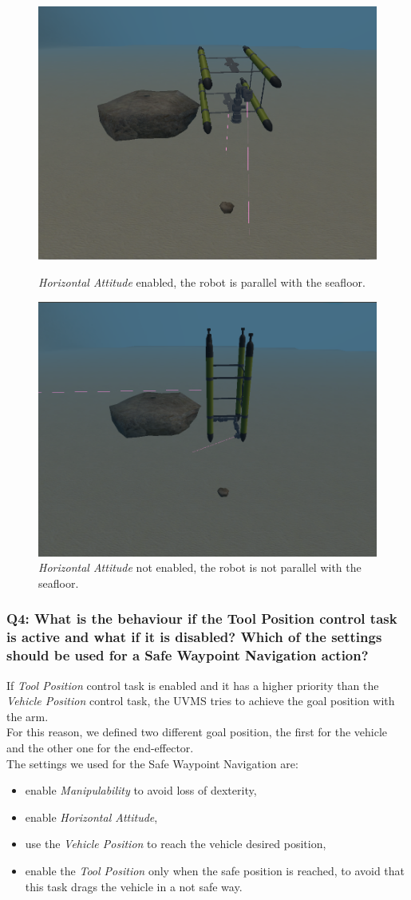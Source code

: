 \documentclass{article}
\begin{document}
\begin{figure}[!htb]
\centering
\includegraphics[width=.5\textwidth]{112_HAenabled.png}\caption{\textit{Horizontal Attitude} enabled, the robot is parallel with the seafloor.}
\label{fig:hae}
\vspace{5px}
\centering
\includegraphics[width=.5\textwidth]{112_HANotenabled.png}\caption{\textit{Horizontal Attitude} not enabled, the robot is not parallel with the seafloor.}
\label{fig:hane}
\end{figure}


\subsubsection{Q4: What is the behaviour if the Tool Position control task is active and what if it is disabled? Which of the settings should be used for a Safe Waypoint Navigation action?}
If \textit{Tool Position} control task is enabled and it has a higher priority than the \textit{Vehicle Position} control task, the UVMS tries to achieve the goal position with the arm. \\
For this reason, we defined two different goal position, the first for the vehicle and the other one for the end-effector. \\
The settings we used for the Safe Waypoint Navigation are:
\begin{itemize}
\item enable \textit{Manipulability} to avoid loss of dexterity,
\item enable \textit{Horizontal Attitude},
\item use the \textit{Vehicle Position} to reach the vehicle desired position,
\item enable the \textit{Tool Position} only when the safe position is reached, to avoid that this task drags the vehicle in a not safe way. 
\end{itemize}
\clearpage
\end{document}
